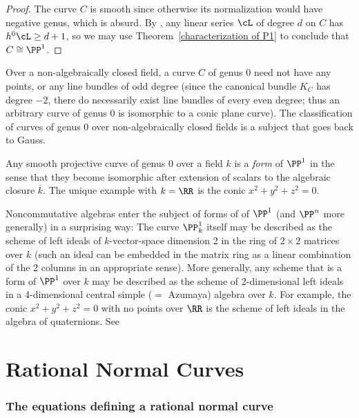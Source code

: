 \begin{proof}
The curve $C$ is smooth since otherwise its normalization would have negative genus, which is absurd.
By \trr, any linear series $\cL$ of degree $d$ on $C$ has $h^0\cL \geq d+1$, so we may use Theorem~\ref{characterization of P1}
to conclude that $C\cong \PP^1$.
\end{proof}


\begin{fact}
Over a non-algebraically closed field, a curve $C$ of genus 0 need not have any points, or any line bundles of odd degree (since the canonical bundle $K_C$ has degree $-2$, there do necessarily exist line bundles of every even degree; thus an arbitrary curve of genus 0 is isomorphic to a conic plane curve). 
The classification of curves of genus 0 over non-algebraically closed fields is a subject that goes back to Gauss.

Any smooth projective curve of genus 0 over a field $k$ is a \emph{form} of $\PP^1$ in the sense that they become isomorphic after extension
of scalars to
the algebraic closure $\overline k$. The unique example with $k = \RR$ is the conic $x^2+y^2+z^2 = 0$. 

Noncommutative algebras enter the subject of forms of of $\PP^1$ (and $\PP^n$ more generally) in a surprising way: The curve $\PP_k^1$ itself may be described as the scheme of left ideals of $k$-vector-space dimension 2 in the ring of
$2\times 2$ matrices over $k$ (such an ideal can be embedded in the matrix ring as a linear combination of the 2 columns in an appropriate sense). More generally, any scheme that is a form of $\PP^1$ over $k$
may be described as the scheme of 2-dimensional left ideals in a 4-dimensional central simple ($=$ Azumaya) algebra over $k$. For example, the
conic $x^2+y^2+z^2 = 0$ with no points over $\RR$ is the scheme of left ideals in the algebra of quaternions. See~\cite[]{Serre-Local Fields?}
\end{fact}

\section{Rational Normal Curves}\label{rational normal curves section}



\subsubsection{The equations defining a rational normal curve}

